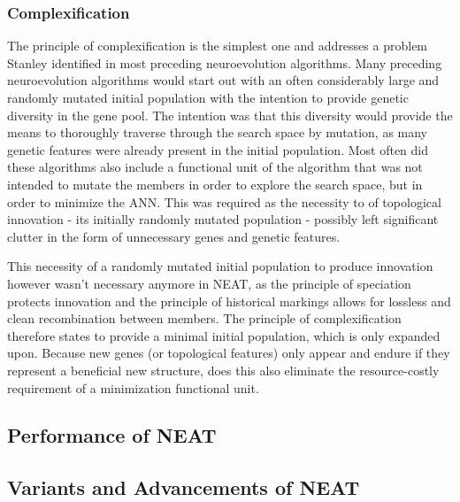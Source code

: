 \documentclass[journal, a4paper]{IEEEtran}
\begin{document}
\subsubsection{Complexification}
The principle of complexification is the simplest one and addresses a problem Stanley identified in most preceding neuroevolution algorithms. Many preceding neuroevolution algorithms would start out with an often considerably large and randomly mutated initial population with the intention to provide genetic diversity in the gene pool. The intention was that this diversity would provide the means to thoroughly traverse through the search space by mutation, as many genetic features were already present in the initial population. Most often did these algorithms also include a functional unit of the algorithm that was not intended to mutate the members in order to explore the search space, but in order to minimize the ANN. This was required as the necessity to of topological innovation - its initially randomly mutated population - possibly left significant clutter in the form of unnecessary genes and genetic features.

This necessity of a randomly mutated initial population to produce innovation however wasn't necessary anymore in NEAT, as the principle of speciation protects innovation and the principle of historical markings allows for lossless and clean recombination between members. The principle of complexification therefore states to provide a minimal initial population, which is only expanded upon. Because new genes (or topological features) only appear and endure if they represent a beneficial new structure, does this also eliminate the resource-costly requirement of a minimization functional unit.





\subsection{Performance of NEAT} \label{sec:neat_performance}

\subsection{Variants and Advancements of NEAT}
\end{document}
